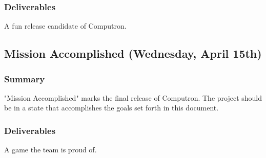 \subsubsection*{Deliverables}
A fun release candidate of Computron.

\subsection{Mission Accomplished (Wednesday, April 15th)}
\subsubsection*{Summary}
"Mission Accomplished" marks the final release of Computron. The project should be in a state that accomplishes the goals set forth in this document.

\subsubsection*{Deliverables}
A game the team is proud of.
